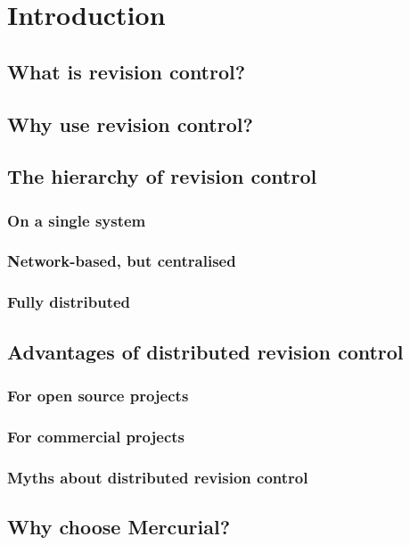 \chapter{Introduction}
\label{chap:intro}

\section{What is revision control?}

\section{Why use revision control?}

\section{The hierarchy of revision control}


\subsection{On a single system}

\subsection{Network-based, but centralised}

\subsection{Fully distributed}


\section{Advantages of distributed revision control}

\subsection{For open source projects}

\subsection{For commercial projects}

\subsection{Myths about distributed revision control}

\section{Why choose Mercurial?}


